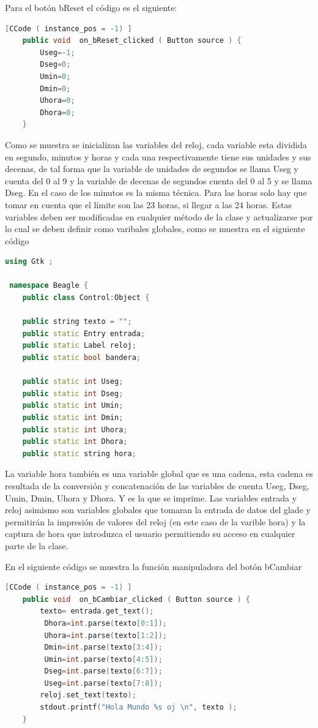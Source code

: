 \documentclass[12pt,twoside]{book}
\begin{document}
Para el botón bReset el código es el siguiente:

\begin{lstlisting}[language=C++]
	[CCode ( instance_pos = -1) ]
  	public void  on_bReset_clicked ( Button source ) {
		Useg=-1;
		Dseg=0;
		Umin=0;
		Dmin=0;
		Uhora=0;
		Dhora=0;
	}
\end{lstlisting}


Como se muestra se inicializan las variables del reloj, cada variable esta dividida en segundo, minutos y horas y cada una respectivamente tiene sus unidades y sus decenas, de tal forma que la variable de unidades de segundos se llama Useg y cuenta del 0 al 9 y la variable de decenas de segundos cuenta del 0 al 5 y se llama Dseg. En el caso de los minutos es la misma técnica. Para las horas solo hay que tomar en cuenta que el límite son las 23 horas, si llegar a las 24 horas. Estas variables deben ser modificadas en cualquier método de la clase y actualizarse por lo cual se deben definir como varibales globales, como se muestra en el siguiente código

\begin{lstlisting}[language=C++]
using Gtk ;

 namespace Beagle {
  	public class Control:Object {
	
	public string texto = "";
	public static Entry entrada;
	public static Label reloj;
	public static bool bandera;

    public static int Useg;
    public static int Dseg;
    public static int Umin;
    public static int Dmin;
    public static int Uhora;
    public static int Dhora;
    public static string hora;
\end{lstlisting}


La variable hora también es una variable global que es una cadena, esta cadena es resultada de la conversión y concatenación de las variables de cuenta Useg, Dseg, Umin, Dmin, Uhora y Dhora. Y es la que se imprime. Las variables entrada y reloj asimismo son variables globales que tomaran la entrada de datos del glade y permitirán la impresión de valores del reloj (en este caso de la varible hora) y la captura de hora que introduzca el usuario permitiendo su acceso en cualquier parte de la clase.

En el siguiente código se muestra la función manipuladora del botón bCambiar

\begin{lstlisting}[language=C++]	
	[CCode ( instance_pos = -1) ]
  	public void  on_bCambiar_clicked ( Button source ) {
		texto= entrada.get_text();
		 Dhora=int.parse(texto[0:1]);
		 Uhora=int.parse(texto[1:2]);
		 Dmin=int.parse(texto[3:4]);
		 Umin=int.parse(texto[4:5]);
		 Dseg=int.parse(texto[6:7]);
		 Useg=int.parse(texto[7:8]);		 
		reloj.set_text(texto);
		stdout.printf("Hola Mundo %s oj \n", texto );
	}
\end{lstlisting}
\end{document}
